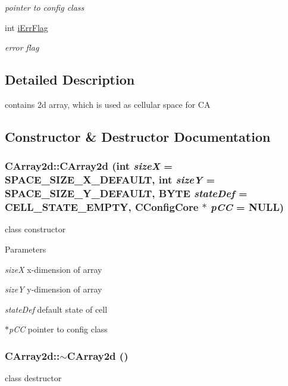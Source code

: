 \begin{DoxyCompactItemize}
\begin{DoxyCompactList}\small\item\em pointer to config class \item\end{DoxyCompactList}\item 
\hypertarget{classCArray2d_a3650a21ae3734efd20a575caa28feeda}{
int \hyperlink{classCArray2d_a3650a21ae3734efd20a575caa28feeda}{iErrFlag}}
\label{classCArray2d_a3650a21ae3734efd20a575caa28feeda}

\begin{DoxyCompactList}\small\item\em error flag \item\end{DoxyCompactList}\end{DoxyCompactItemize}


\subsection{Detailed Description}
contains 2d array, which is used as cellular space for CA 

\subsection{Constructor \& Destructor Documentation}
\hypertarget{classCArray2d_a89adc38a3b0859b819fee52cc054f519}{
\subsubsection[{CArray2d}]{\setlength{\rightskip}{0pt plus 5cm}CArray2d::CArray2d (int {\em sizeX} = {\ttfamily SPACE\_\-SIZE\_\-X\_\-DEFAULT}, \/  int {\em sizeY} = {\ttfamily SPACE\_\-SIZE\_\-Y\_\-DEFAULT}, \/  BYTE {\em stateDef} = {\ttfamily CELL\_\-STATE\_\-EMPTY}, \/  {\bf CConfigCore} $\ast$ {\em pCC} = {\ttfamily NULL})}}
\label{classCArray2d_a89adc38a3b0859b819fee52cc054f519}
class constructor


\begin{DoxyParams}{Parameters}
\item[{\em sizeX}]x-\/dimension of array \item[{\em sizeY}]y-\/dimension of array \item[{\em stateDef}]default state of cell \item[{\em $\ast$pCC}]pointer to config class \end{DoxyParams}
\hypertarget{classCArray2d_a166233a87063ef3ae7d510c8f055df56}{
\subsubsection[{$\sim$CArray2d}]{\setlength{\rightskip}{0pt plus 5cm}CArray2d::$\sim$CArray2d ()}}
\label{classCArray2d_a166233a87063ef3ae7d510c8f055df56}
class destructor 

